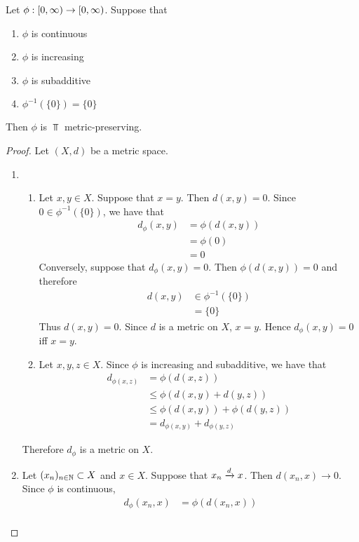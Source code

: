 \documentclass{book}
\begin{document}
\begin{ex}
	Let $\phi: [0,\infty) \rightarrow [0,\infty)$. Suppose that
	\begin{enumerate}
		\item $\phi$ is continuous
		\item $\phi$ is increasing
		\item $\phi$ is subadditive
		\item $\phi^{-1}(\{0\}) = \{0\}$
	\end{enumerate}
	Then $\phi$ is $\Top$ metric-preserving.
\end{ex}

\begin{proof}
	Let $(X, d)$ be a metric space.
	\begin{enumerate}
		\item
		\begin{enumerate}
			\item Let $x, y \in X$. Suppose that $x = y$. Then $d(x,y) = 0$. Since $0 \in \phi^{-1}(\{0\})$, we have that
			\begin{align*}
				d_{\phi} (x,y)
				& = \phi(d(x,y)) \\
				& = \phi(0) \\
				& = 0
			\end{align*}
			Conversely, suppose that $ d_{\phi}(x,y) = 0$. Then $\phi(d(x,y)) = 0$ and therefore
			\begin{align*}
				d(x,y)
				& \in \phi^{-1}(\{0\}) \\
				& = \{0\}
			\end{align*}
			Thus $d(x,y) = 0$. Since $d$ is a metric on $X$, $x = y$. Hence $d_{\phi}(x,y) = 0$ iff $x = y$.
			\item Let $x,y,z \in X$. Since $\phi$ is increasing and subadditive, we have that
			\begin{align*}
				d_{\phi(x,z)}
				& = \phi(d(x,z)) \\
				& \leq \phi(d(x,y) + d(y,z)) \\
				& \leq \phi(d(x,y)) + \phi(d(y,z)) \\
				& = d_{\phi(x,y)} + d_{\phi(y,z)}
			\end{align*}
		\end{enumerate}
		Therefore $d_{\phi}$ is a metric on $X$. 
		\item Let $(x_n)_{n \in \mathbb{N}} \subset X$ and $x \in X$. Suppose that $x_n \xrightarrow{d} x$. Then $d(x_n, x) \rightarrow 0$. Since $\phi$ is continuous, 
		\begin{align*}
			d_{\phi}(x_n, x)
			& = \phi(d(x_n,x)) \\

\end{align*}
\end{enumerate}
\end{proof}
\end{document}
